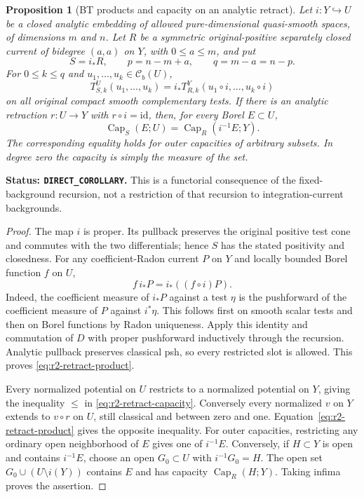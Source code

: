\documentclass[11pt,a4paper]{article}
\numberwithin{equation}{section}
\newtheorem{proposition}[theorem]{Proposition}
\theoremstyle{definition}
\theoremstyle{remark}
\newcommand{\Cb}{\mathcal C_b}
\begin{document}
\begin{proposition}[BT products and capacity on an analytic retract]
\label{prop:r2-retract}
Let $i:Y\hookrightarrow U$ be a closed analytic embedding of allowed
pure-dimensional quasi-smooth spaces, of dimensions $m$ and $n$.
Let $R$ be a symmetric original-positive separately closed current of
bidegree $(a,a)$ on $Y$, with $0\leq a\leq m$, and put
\[
 S=i_*R,\qquad p=n-m+a,\qquad q=m-a=n-p.
\]
For $0\leq k\leq q$ and $u_1,\ldots,u_k\in\Cb(U)$,
\begin{equation}
\label{eq:r2-retract-product}
 T^U_{S,k}(u_1,\ldots,u_k)
   =i_*T^Y_{R,k}(u_1\circ i,\ldots,u_k\circ i)
\end{equation}
on all original compact smooth complementary tests.
If there is an analytic retraction $r:U\to Y$ with $r\circ i=\mathrm{id}$,
then, for every Borel $E\subset U$,
\begin{equation}
\label{eq:r2-retract-capacity}
 \operatorname{Cap}_{S}(E;U)
     =\operatorname{Cap}_{R}(i^{-1}E;Y).
\end{equation}
The corresponding equality holds for outer capacities of arbitrary
subsets. In degree zero the capacity is simply the measure of the set.
\end{proposition}

\noindent\textbf{Status: \texttt{DIRECT\_COROLLARY}.}
This is a functorial consequence of the fixed-background recursion,
not a restriction of that recursion to integration-current backgrounds.

\begin{proof}
The map $i$ is proper. Its pullback preserves the original positive
test cone and commutes with the two differentials; hence $S$ has the
stated positivity and closedness. For any coefficient-Radon current
$P$ on $Y$ and locally bounded Borel function $f$ on $U$,
\[
 f\,i_*P=i_*((f\circ i)P).
\]
Indeed, the coefficient measure of $i_*P$ against a test $\eta$ is
the pushforward of the coefficient measure of $P$ against $i^*\eta$.
This follows first on smooth scalar tests and then on Borel functions
by Radon uniqueness. Apply this identity and commutation of $D$ with
proper pushforward inductively through the recursion. Analytic
pullback preserves classical psh, so every restricted slot is allowed.
This proves \eqref{eq:r2-retract-product}.

Every normalized potential on $U$ restricts to a normalized potential
on $Y$, giving the inequality $\leq$ in
\eqref{eq:r2-retract-capacity}. Conversely every normalized $v$ on
$Y$ extends to $v\circ r$ on $U$, still classical and between zero
and one. Equation~\eqref{eq:r2-retract-product} gives the opposite
inequality. For outer capacities, restricting any ordinary open
neighborhood of $E$ gives one of $i^{-1}E$. Conversely, if $H\subset Y$
is open and contains $i^{-1}E$, choose an open $G_0\subset U$ with
$i^{-1}G_0=H$. The open set $G_0\cup(U\setminus i(Y))$ contains
$E$ and has capacity $\operatorname{Cap}_{R}(H;Y)$. Taking infima
proves the assertion.
\end{proof}
\end{document}
